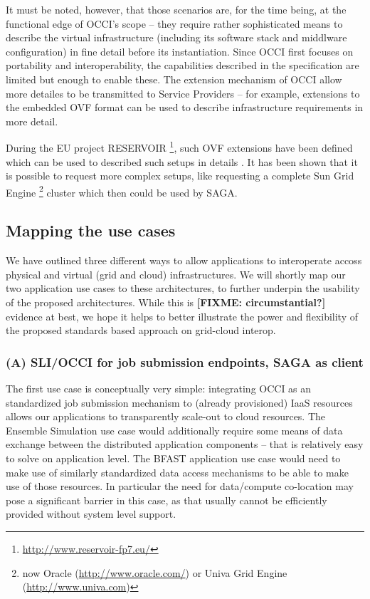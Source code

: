 \documentclass[10pt,conference,final,letterpaper,twoside,twocolumn,]{IEEEtran}
\newcommand{\B}[1]{\textbf{#1}}
\newcommand{\F}[1]{\B{[FIXME: #1]}}
\begin{document}
 It must be noted, however, that those scenarios are, for the time
 being, at the functional edge of OCCI's scope -- they require rather
 sophisticated means to describe the virtual infrastructure (including
 its software stack and middlware configuration) in fine detail before
 its instantiation. Since OCCI first focuses on portability and
 interoperability, the capabilities described in the specification are
 limited but enough to enable these. The extension mechanism of OCCI
 allow more detailes to be transmitted to Service Providers -- for
 example, extensions to the embedded OVF format can be used to describe
 infrastructure requirements in more detail.

 During the EU project RESERVOIR
 \footnote{\url{http://www.reservoir-fp7.eu/}}, such OVF extensions have been
 defined which can be used to described such setups in details
 \cite{comsware09}.  It has been shown that it is possible to request
 more complex setups, like requesting a complete Sun Grid Engine
 \footnote{now Oracle (\url{http://www.oracle.com/}) or Univa Grid
 Engine (\url{http://www.univa.com})} cluster which then could be used
 by SAGA.


 \subsection{Mapping the use cases}

 We have outlined three different ways to allow applications to
 interoperate accoss physical and virtual (grid and cloud)
 infrastructures.  We will shortly map our two application use cases
 to these architectures, to further underpin the usability of the
 proposed architectures.  While this is \F{circumstantial?} evidence
 at best, we hope it helps to better illustrate the power and
 flexibility of the proposed standards based approach on grid-cloud
 interop.

 \subsubsection*{(A) SLI/OCCI for job submission endpoints, SAGA as client}

 The first use case is conceptually very simple: integrating OCCI as
 an standardized job submission mechanism to (already provisioned)
 IaaS resources allows our applications to transparently scale-out to
 cloud resources.  The Ensemble Simulation use case would additionally
 require some means of data exchange between the distributed
 application components -- that is relatively easy to solve on
 application level.  The BFAST application use case would need to make
 use of similarly standardized data access mechanisms to be able to
 make use of those resources.  In particular the need for data/compute
 co-location may pose a significant barrier in this case, as that
 usually cannot be efficiently provided without system level support.
  
\end{document}

